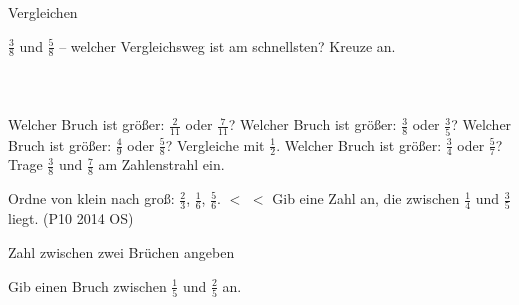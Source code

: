 \setcounter{aufgabe}{17}

\begin{aufgabe}{Vergleichen}
\begin{teile}
\teil $\frac{3}{8}$ und $\frac{5}{8}$ – welcher Vergleichsweg ist am schnellsten? Kreuze an.\\ \\ \\ \\ 
\teil Welcher Bruch ist größer: $\frac{2}{11}$ oder $\frac{7}{11}$? \leerfeld
\teil Welcher Bruch ist größer: $\frac{3}{8}$ oder $\frac{3}{5}$? \leerfeld
\teil Welcher Bruch ist größer: $\frac{4}{9}$ oder $\frac{5}{8}$? Vergleiche mit $\frac{1}{2}$. \leerfeld
\teil Welcher Bruch ist größer: $\frac{3}{4}$ oder $\frac{5}{7}$? \leerfeld
\teil Trage $\frac{3}{8}$ und $\frac{7}{8}$ am Zahlenstrahl ein.

\teil Ordne von klein nach groß: $\frac{2}{3}$, $\frac{1}{6}$, $\frac{5}{6}$. \leerfeld $<$ \leerfeld $<$ \leerfeld
\teil Gib eine Zahl an, die zwischen $\frac{1}{4}$ und $\frac{3}{5}$ liegt. \hfill (P10 2014 OS) \\ \leerfeld
\end{teile}
\end{aufgabe}

\begin{aufgabe}{Zahl zwischen zwei Brüchen angeben}
\begin{teile}
\teil Gib einen Bruch zwischen $\frac{1}{5}$ und $\frac{2}{5}$ an. \leerfeld
\end{teile}
\end{aufgabe}

